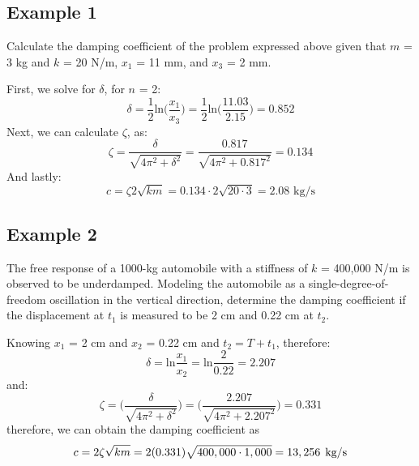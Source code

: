 \documentclass[12pt,a4paper]{article}
\begin{document}
		\subsection*{Example 1}
			Calculate the damping coefficient of the problem expressed above given that $m$ = 3 kg and $k$ = 20 N/m, $x_1$ = 11 mm, and $x_3$ = 2 mm.
			
			First, we solve for $\delta$, for $n$ = 2:  
			\begin{equation}
				\delta = \frac{1}{2}\text{ln}\bigg(\frac{x_{\text{1}}}{x_{\text{3}}}\bigg) = \frac{1}{2}\text{ln}\bigg(\frac{11.03}{2.15}\bigg) = 0.852
			\end{equation}						
			Next, we can calculate $\zeta$, as: 
			\begin{equation}
				\zeta = \frac{\delta}{\sqrt{4\pi^2+\delta^2}} = \frac{0.817}{\sqrt{4\pi^2+0.817^2}} = 0.134
			\end{equation}
			And lastly:			
			\begin{equation}
				c = \zeta 2\sqrt{km} = 0.134 \cdot 2\sqrt{20 \cdot 3} = 2.08 \text{ kg/s}
			\end{equation}	
			
		\subsection*{Example 2} 
			The free response of a 1000-kg automobile with a stiffness of $k$ = 400,000 N/m is observed to be underdamped. Modeling the automobile as a single-degree-of-freedom oscillation in the vertical direction, determine the damping coefficient if the displacement at $t_1$ is measured to be 2 cm and 0.22 cm at $t_2$.
			
			Knowing $x_1$ = 2 cm and $x_2$ = 0.22 cm and $t_2 = T + t_1$, therefore:
			\begin{equation}
				\delta = \text{ln}\frac{x_1}{x_2} = \text{ln}\frac{2}{0.22} = 2.207
			\end{equation}			
			and:
			\begin{equation}
				\zeta = \bigg(\frac{\delta}{\sqrt{4\pi^2+\delta^2}}\bigg) = \bigg(\frac{2.207}{\sqrt{4\pi^2+2.207^2}}\bigg) = 0.331
			\end{equation}
			therefore, we can obtain the damping coefficient as
			\begin{equation}
				c = 2\zeta\sqrt{km}=2(0.331)\sqrt{400,000 \cdot 1,000} = 13,256 \hspace{1ex} 
				\text{kg/s} 
			\end{equation}	
		
\end{document}
